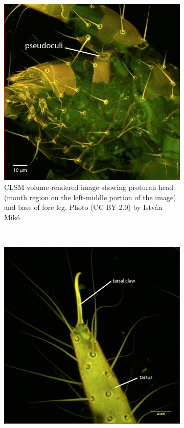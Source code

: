 \documentclass[letterpaper, 11pt]{article}
\begin{document}
\begin{figure}[ht!]
    \centering
    \begin{subfigure}[ht!]{0.45\textwidth}
        \includegraphics[width=\textwidth]{image21}
        \caption{CLSM volume rendered image showing proturan head (mouth region on the left-middle portion of the image) and base of fore leg. Photo (CC BY 2.0) by Istv\'an Mik\'o }
        \label{fig:prothead}
    \end{subfigure}
    ~ %
    \begin{subfigure}[ht!]{0.45\textwidth}
        \includegraphics[width=\textwidth]{image23}

\end{subfigure}
\end{figure}
\end{document}

